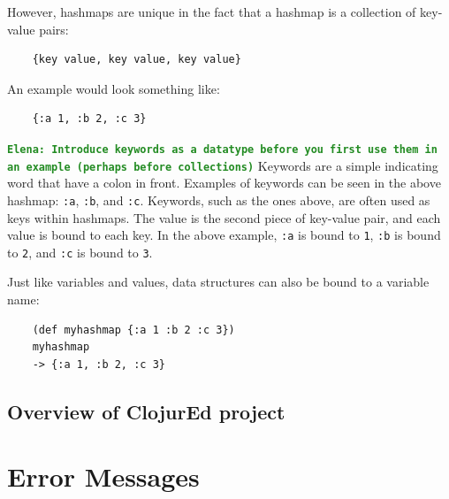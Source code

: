 \documentclass[12pt]{article}
\newcommand{\comment}[1]{{\bf \tt  {#1}}}
\newcommand{\emcomment}[1]{\textcolor{ForestGreen}{\comment{Elena: {#1}}}}
\begin{document}
However, hashmaps are unique in the fact that a hashmap is a collection of key-value pairs: 
\begin{verbatim}
	{key value, key value, key value}
\end{verbatim}

An example 
 would look something like:
\begin{verbatim}
	{:a 1, :b 2, :c 3}
\end{verbatim}

\emcomment{Introduce keywords as a datatype before you first use them in an example (perhaps before collections)}
Keywords are a simple indicating word that have a colon in front. Examples of keywords can be seen in the
above hashmap: \texttt{:a}, \texttt{:b}, and \texttt{:c}. Keywords, such as the ones above,
are often used as keys within hashmaps. The value is the second piece of key-value pair,
and each value is bound to each key. In the above example, \texttt{:a} is bound to \texttt{1}, \texttt{:b}
is bound to \texttt{2}, and \texttt{:c} is bound to \texttt{3}.


Just like variables and values, data structures can also be bound to a
variable name: 
\begin{verbatim}
	(def myhashmap {:a 1 :b 2 :c 3})
	myhashmap
	-> {:a 1, :b 2, :c 3}
\end{verbatim}


\subsection{Overview of ClojurEd project}\label{sec:project}

\section{Error Messages}\label{sec:errors}
\end{document}
